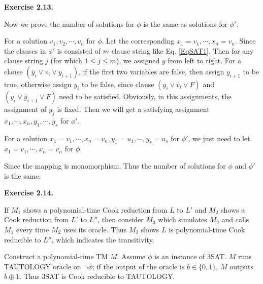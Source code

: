 \documentclass[a4paper]{article}
\newenvironment{exercise}[1]{
	\par
	\noindent\textbf{Exercise #1.}\quad
}{
	\par
	\bigskip
}
\newcommand{\bin}{\{0,1\}}
\begin{document}
\begin{exercise}{2.13}
\begin{itemize}
Now we prove the number of solutions for $\phi$ is the same as solutions for $\phi'$.

For a solution $v_{1}, v_{2}, \cdots, v_{n}$ for $\phi$. Let the corresponding $x_{1} = v_{1},\cdots, x_{n} = v_{n}$. Since the clauses in $\phi'$ is consisted of $m$ clause string like Eq. \eqref{EqSAT1}. Then for any clause string $j$ (for which $1
\leq j \leq m$), we assigned $y$ from left to right. For a clause $(\bar{y}_{i}\vee v_{i} \vee y_{i+1})$, if the first two variables are false, then assign $y_{i+1}$ to be true, otherwise assign $y_{i}$ to be false, since clause $(y_{i}\vee \bar{v}_{i} \vee F)$ and $({y}_{i}\vee \bar{y}_{i+1} \vee F)$ need to be satisfied. Obviously, in this assignments, the assignment of $y_{j}$ is fixed. Then we will get a satisfying assignment $x_{1},\cdots, x_{n}, y_{1},\cdots, y_{s}$ for $\phi'$.

For a solution $x_{1} = v_{1},\cdots, x_{n}= v_{n}, y_{1}=u_{1},\cdots, y_{s}= u_{s}$ for $\phi'$, we just need to let $x_{1} = v_{1},\cdots, x_{n}= v_{n}$ for $\phi$.

Since the mapping is monomorphism. Thus the number of solutions for $\phi$ and $\phi'$ is the same.
\end{itemize} 
\end{exercise}

    \begin{exercise}{2.14}
        If $M_1$ shows a polynomial-time Cook reduction from $L$ to $L'$ and $M_2$ shows a Cook reduction from $L'$ to $L''$,
        then consider $M_3$ which simulates $M_2$ and calls $M_1$ every time $M_2$ uses its oracle. Thus $M_3$ shows 
        $L$ is polynomial-time Cook reducible to $L''$, which indicates the transitivity.

        Construct a polynomial-time TM $M$. Assume $\phi$ is an instance of 3SAT. 
        $M$ runs TAUTOLOGY oracle on $\neg\phi$; if the output of the oracle is $b\in\bin$, $M$ outputs $b\oplus 1$.
        Thus 3SAT is Cook reducible to TAUTOLOGY.
    \end{exercise}
	
\end{document}

